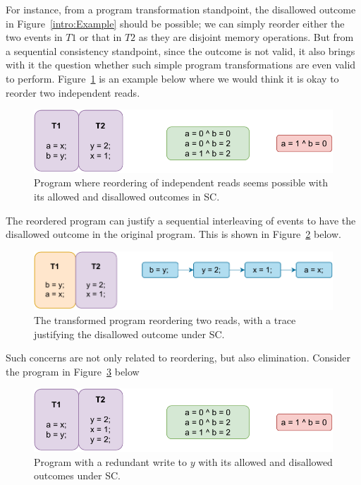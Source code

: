     For instance, from a program transformation standpoint, the disallowed outcome in Figure~\ref{intro:Example} should be possible; we can simply reorder either the two events in $T1$ or that in $T2$ as they are disjoint memory operations. 
    But from a sequential consistency standpoint, since the outcome is not valid, it also brings with it the question whether such simple program transformations are even valid to perform.
    Figure~\ref{intro:Example2(a)} is an example below where we would think it is okay to reorder two independent reads. 
    \begin{figure}[H]
        \centering
        \includegraphics[scale=0.7]{2.Background/SC_Reordering(a).pdf}
        \caption{Program where reordering of independent reads seems possible with its allowed and disallowed outcomes in SC.}
        \label{intro:Example2(a)}
    \end{figure}

    The reordered program can justify a sequential interleaving of events to have the disallowed outcome in the original program. 
    This is shown in Figure~\ref{intro:Example2(b)} below.

    \begin{figure}[H]
        \centering
        \includegraphics[scale=0.7]{2.Background/SC_Reordering(b).pdf}
        \caption{The transformed program reordering two reads, with a trace justifying the disallowed outcome under SC.}
        \label{intro:Example2(b)}
    \end{figure}

    Such concerns are not only related to reordering, but also elimination. 
    Consider the program in Figure~\ref{intro:Example3(a)} below
    \begin{figure}[H]
        \centering
        \includegraphics[scale=0.7]{2.Background/SC_Example2(a).pdf}
        \caption{Program with a redundant write to $y$ with its allowed and disallowed outcomes under SC.}
        \label{intro:Example3(a)}
    \end{figure}

